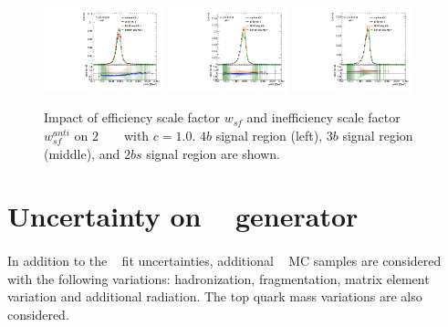 \begin{figure}[htb!]
\begin{center}
\includegraphics[width=0.31\textwidth,angle=-90]{figures/boosted/AppendixbSF/directcompare_mHH_l_bSF_2000_FT_EFF_Eigen_B_0__1down_TwoTag_split_.pdf}
\includegraphics[width=0.31\textwidth,angle=-90]{figures/boosted/AppendixbSF/directcompare_mHH_l_bSF_2000_FT_EFF_Eigen_B_0__1down_ThreeTag_.pdf}
\includegraphics[width=0.31\textwidth,angle=-90]{figures/boosted/AppendixbSF/directcompare_mHH_l_bSF_2000_FT_EFF_Eigen_B_0__1down_FourTag_.pdf}
\caption{Impact of efficiency scale factor $w_{sf}$ and inefficiency scale factor $w_{sf}^{anti}$ on $2$ \TeV~ \Grav~ with $c=1.0$. $4b$ signal region (left), $3b$ signal region (middle), and $2bs$ signal region are shown.}
\label{fig:signal_bsyst_reduction}
\end{center}
\end{figure}
\section{Uncertainty on \ttbar~ generator}
\label{sec:ttbar-mc-unc}

\paragraph{}
In addition to the \ttbar~ fit uncertainties, additional \ttbar~ MC samples are considered with the following variations: hadronization, fragmentation, matrix element variation and additional radiation.
The top quark mass variations are also considered. 

